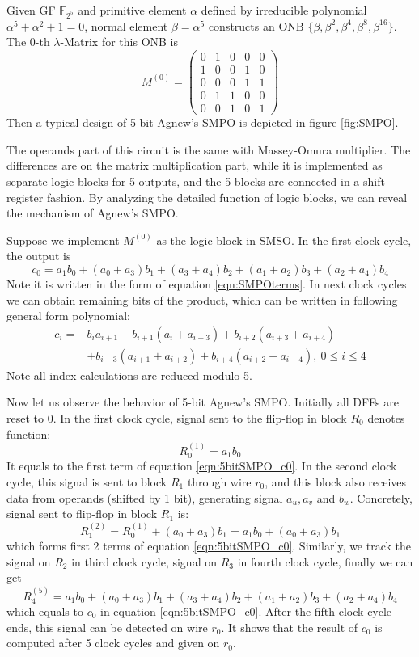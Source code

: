 \begin{Example}
Given GF $\mathbb F_{2^5}$ and primitive element $\alpha$ defined by irreducible polynomial 
$\alpha^5+\alpha^2+1=0$, normal element $\beta = \alpha^5$ constructs an ONB $\{\beta,\beta^2,\beta^4,\beta^8,\beta^{16}\}$.
The $0$-th $\lambda$-Matrix for this ONB is
\begin{equation*}
M^{(0)} = \left(\begin{array}{lcccr}
0 &1 &0 &0 &0 \\
1 &0 &0 &1 &0 \\
0 &0 &0 &1 &1 \\
0 &1 &1 &0 &0 \\
0 &0 &1 &0 &1
\end{array}\right)
\end{equation*}
Then a typical design of 5-bit Agnew's SMPO is depicted in figure \ref{fig:SMPO}.

The operands part of this circuit is the same with Massey-Omura multiplier. The differences are on 
the matrix multiplication part, while it is implemented as separate logic blocks for 5 outputs,
and the 5 blocks are connected in a shift register fashion. By analyzing the detailed function of 
logic blocks, we can reveal the mechanism of Agnew's SMPO.

Suppose we implement $M^{(0)}$ as the logic block in SMSO. In the first clock cycle, the output is
\begin{equation}
\label{eqn:5bitSMPO_c0}
c_0 = a_1b_0+(a_0+a_3)b_1 + (a_3+a_4)b_2 + (a_1+a_2)b_3 + (a_2+a_4)b_4
\end{equation}
Note it is written in the form of equation \ref{eqn:SMPOterms}. In next clock cycles we can obtain 
remaining bits of the product, which can be written in following general form polynomial:
\begin{align}
c_i =& b_ia_{i+1} + b_{i+1}(a_i + a_{i+3}) + b_{i+2}(a_{i+3} + a_{i+4}) \nonumber\\
&+ b_{i+3}(a_{i+1} + a_{i+2}) + b_{i+4}
(a_{i+2} + a_{i+4}),\ 0\leq i\leq 4 \nonumber
\end{align}
Note all index calculations are reduced modulo 5.

Now let us observe the behavior of 5-bit Agnew's SMPO. Initially all DFFs are reset to 0. 
In the first clock cycle,
signal sent to the flip-flop in block $R_0$ denotes function:
$$R_0^{(1)} = a_1b_0$$
It equals to the first term of equation \ref{eqn:5bitSMPO_c0}. In the second clock cycle,
this signal is sent to block $R_1$ through wire $r_0$, and this block also receives data 
from operands (shifted by 1 bit), generating signal $a_u,a_v$ and $b_w$. Concretely,
signal sent to flip-flop in block $R_1$ is:
$$R_1^{(2)} = R_0^{(1)} + (a_0+a_3)b_1 = a_1b_0+(a_0+a_3)b_1$$
which forms first 2 terms of equation \ref{eqn:5bitSMPO_c0}. Similarly, we track the signal 
on $R_2$ in third clock cycle, signal on $R_3$ in fourth clock cycle, finally we can get 
$$R_4^{(5)} = a_1b_0+(a_0+a_3)b_1 + (a_3+a_4)b_2 + (a_1+a_2)b_3 + (a_2+a_4)b_4$$
which equals to $c_0$ in equation \ref{eqn:5bitSMPO_c0}.
After the fifth clock cycle ends, this signal can be detected on wire $r_0$. It shows that 
the result of $c_0$ is computed after 5 clock cycles and given on $r_0$.


\end{Example}
